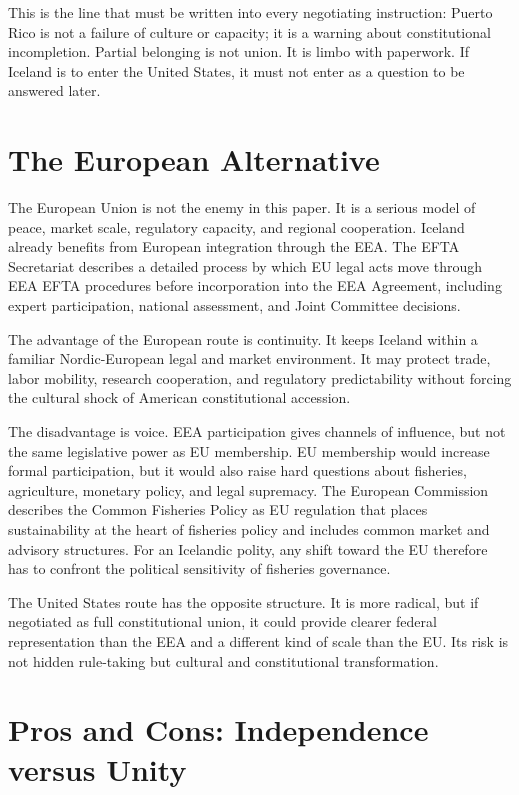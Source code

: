 \documentclass[11pt,a4paper]{article}
\begin{document}
This is the line that must be written into every negotiating instruction: Puerto Rico is not a failure of culture or capacity; it is a warning about constitutional incompletion. Partial belonging is not union. It is limbo with paperwork. If Iceland is to enter the United States, it must not enter as a question to be answered later.

\section{The European Alternative}
The European Union is not the enemy in this paper. It is a serious model of peace, market scale, regulatory capacity, and regional cooperation. Iceland already benefits from European integration through the EEA. The EFTA Secretariat describes a detailed process by which EU legal acts move through EEA EFTA procedures before incorporation into the EEA Agreement, including expert participation, national assessment, and Joint Committee decisions.\cite{eftaeea}

The advantage of the European route is continuity. It keeps Iceland within a familiar Nordic-European legal and market environment. It may protect trade, labor mobility, research cooperation, and regulatory predictability without forcing the cultural shock of American constitutional accession.

The disadvantage is voice. EEA participation gives channels of influence, but not the same legislative power as EU membership. EU membership would increase formal participation, but it would also raise hard questions about fisheries, agriculture, monetary policy, and legal supremacy. The European Commission describes the Common Fisheries Policy as EU regulation that places sustainability at the heart of fisheries policy and includes common market and advisory structures.\cite{eucfp} For an Icelandic polity, any shift toward the EU therefore has to confront the political sensitivity of fisheries governance.

The United States route has the opposite structure. It is more radical, but if negotiated as full constitutional union, it could provide clearer federal representation than the EEA and a different kind of scale than the EU. Its risk is not hidden rule-taking but cultural and constitutional transformation.

\section{Pros and Cons: Independence versus Unity}
\end{document}
